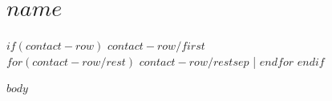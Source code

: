 \documentclass[$if(fontsize)$$fontsize$$else$10pt$endif$,letterpaper]{article}
\def\name{$name$}
\begin{document}
{\centering\section{\huge\rmfamily\scshape\itshape \name}}

\vspace{-0.25\baselineskip}

{
$if(contact-row)$
\noindent $contact-row/first$ \\
$for(contact-row/rest)$
$contact-row/rest$$sep$ \hspace{0.75em}|\hspace{0.75em}
$endfor$
$endif$


\vspace{-0.5\baselineskip}

$body$
}
\end{document}
